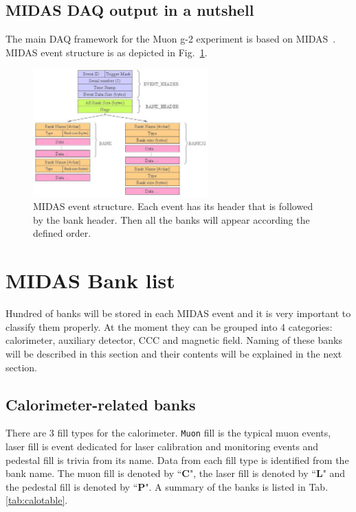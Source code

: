 \subsection{MIDAS DAQ output in a nutshell}
The main DAQ framework for the Muon g-2 experiment is based on MIDAS~\cite{Midas}. 
MIDAS event structure is as depicted in Fig.~\ref{fig:MIDASEventStructure}.

\begin{figure}[htbp]
\centering
\includegraphics[width=0.6\textwidth]{pics/MIDASEventStructure.pdf} 
\caption{MIDAS event structure. Each event has its header that is followed by the bank header. Then all the banks will appear according the defined order.}\label{fig:MIDASEventStructure}
\end{figure}

\section{MIDAS Bank list}

Hundred of banks will be stored in each MIDAS event and it is very important to classify them properly. At the moment they can be grouped into 4 categories: calorimeter, auxiliary detector, CCC and magnetic field. Naming of these banks will be described in this section and their contents will be explained in the next section.

\subsection{Calorimeter-related banks}

There are 3 fill types for the calorimeter. \verb+Muon+ fill is the typical muon events, laser fill is event dedicated for laser calibration and monitoring events and pedestal fill is trivia from its name. Data from each fill type is identified from the bank name. The muon fill is denoted by ``\textbf{C}", the laser fill is denoted by ``\textbf{L}" and the pedestal fill is denoted by ``\textbf{P}". A summary of the banks is listed in Tab. \ref{tab:calotable}.

